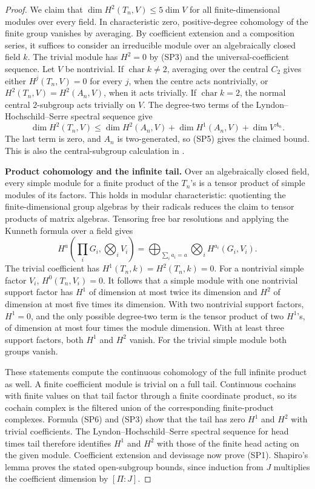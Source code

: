 \begin{proof}
We claim that \(\dim H^2(T_n,V)\leq5\dim V\) for all finite-dimensional
modules over every field.  In characteristic zero, positive-degree
cohomology of the finite group vanishes by averaging.
By coefficient extension and a composition
series, it suffices to consider an irreducible module over an
algebraically closed field \(k\).  The trivial module has \(H^2=0\)
by (SP3) and the universal-coefficient sequence.  Let \(V\) be
nontrivial.  If \(\operatorname{char}k\ne2\), averaging over the central
\(C_2\) gives either \(H^j(T_n,V)=0\) for every \(j\), when the centre
acts nontrivially, or
\(H^2(T_n,V)=H^2(A_n,V)\), when it acts trivially.
If \(\operatorname{char}k=2\), the normal central \(2\)-subgroup
acts trivially on \(V\).  The degree-two terms of the
Lyndon--Hochschild--Serre spectral sequence give
\[
 \dim H^2(T_n,V)
 \leq \dim H^2(A_n,V)+\dim H^1(A_n,V)+\dim V^{A_n}.
\]
The last term is zero, and \(A_n\) is two-generated, so (SP5)
gives the claimed bound.  This is also the central-subgroup
calculation in \cite[Lemma~4.1 and its proof, p.~481]
{GKKL2007SuperperfectB}.

\par\smallskip\noindent\textbf{Product cohomology and the infinite tail.}\quad
Over an algebraically closed field, every simple module for a finite
product of the \(T_n\)'s is a tensor product of simple modules of its
factors.  This holds in modular characteristic: quotienting the
finite-dimensional group algebras by their radicals reduces the
claim to tensor products of matrix algebras.
Tensoring free bar resolutions and applying the Kunneth formula
over a field gives
\[
 H^a\!\left(\prod_i G_i,\bigotimes_i V_i\right)
 =
 \bigoplus_{\sum_i a_i=a}\bigotimes_i H^{a_i}(G_i,V_i).
 \tag{SP6}
\]
The trivial coefficient has \(H^1(T_n,k)=H^2(T_n,k)=0\).
For a nontrivial simple factor \(V_i\), \(H^0(T_n,V_i)=0\).
It follows that a simple module with one nontrivial support factor
has \(H^1\) of dimension at most twice its dimension and \(H^2\)
of dimension at most five times its dimension.  With two nontrivial
support factors, \(H^1=0\), and the only possible degree-two term is
the tensor product of two \(H^1\)'s, of dimension at most four times
the module dimension.  With at least three support factors,
both \(H^1\) and \(H^2\) vanish.  For the trivial simple module both
groups vanish.

These statements compute the continuous cohomology of the full
infinite product as well.  A finite coefficient module is trivial
on a full tail.  Continuous cochains with finite values on that
tail factor through a finite coordinate product, so its cochain
complex is the filtered union of the corresponding finite-product
complexes.  Formula (SP6) and (SP3) show that the tail has zero
\(H^1\) and \(H^2\) with trivial coefficients.  The
Lyndon--Hochschild--Serre spectral sequence for head times tail
therefore identifies \(H^1\) and \(H^2\) with those of the finite
head acting on the given module.  Coefficient extension and
devissage now prove (SP1).  Shapiro's lemma proves the stated
open-subgroup bounds, since induction from \(J\) multiplies the
coefficient dimension by \([\Pi:J]\).


\end{proof}
